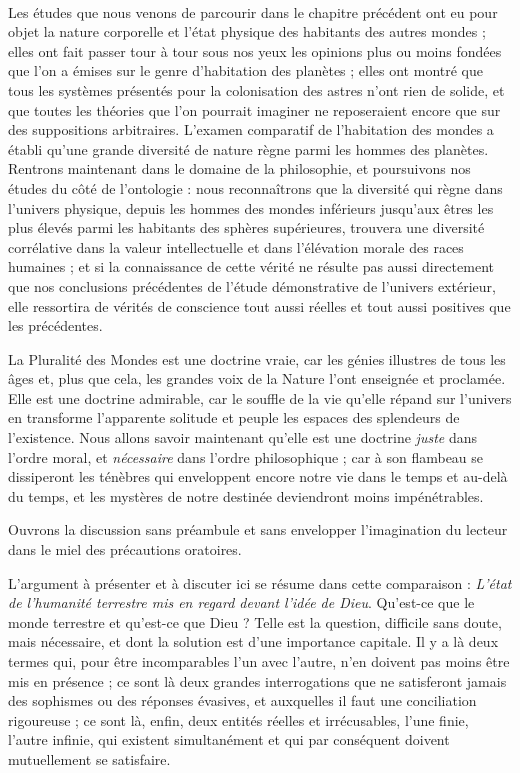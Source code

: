 \documentclass[a4paper, 11pt, oneside, landscape]{article}
\begin{document}
\paragraph{}
Les études que nous venons de parcourir dans le chapitre précédent ont eu pour objet la nature corporelle et l'état physique des habitants des autres mondes ; elles ont fait passer tour à tour sous nos yeux les opinions plus ou moins fondées que l'on a émises sur le genre d'habitation des planètes ; elles ont montré que tous les systèmes présentés pour la colonisation des astres n'ont rien de solide, et que toutes les théories que l'on pourrait imaginer ne reposeraient encore que sur des suppositions arbitraires. L'examen comparatif de l'habitation des mondes a établi qu'une grande diversité de nature règne parmi les hommes des planètes. Rentrons maintenant dans le domaine de la philosophie, et poursuivons nos études du côté de l'ontologie : nous reconnaîtrons que la diversité qui règne dans l'univers physique, depuis les hommes des mondes inférieurs jusqu'aux êtres les plus élevés parmi les habitants des sphères supérieures, trouvera une diversité corrélative dans la valeur intellectuelle et dans l'élévation morale des races humaines ; et si la connaissance de cette vérité ne résulte pas aussi directement que nos conclusions précédentes de l'étude démonstrative de l'univers extérieur, elle ressortira de vérités de conscience tout aussi réelles et tout aussi positives que les précédentes.

La Pluralité des Mondes est une doctrine vraie, car les génies illustres de tous les âges et, plus que cela, les grandes voix de la Nature l'ont enseignée et proclamée. Elle est une doctrine admirable, car le souffle de la vie qu'elle répand sur l'univers en transforme l'apparente solitude et peuple les espaces des splendeurs de l'existence. Nous allons savoir maintenant qu'elle est une doctrine \emph{juste} dans l'ordre moral, et \emph{nécessaire} dans l'ordre philosophique ; car à son flambeau se dissiperont les ténèbres qui enveloppent encore notre vie dans le temps et au-delà du temps, et les mystères de notre destinée deviendront moins impénétrables.

Ouvrons la discussion sans préambule et sans envelopper l'imagination du lecteur dans le miel des précautions oratoires.

L'argument à présenter et à discuter ici se résume dans cette comparaison : \emph{L'état de l'humanité terrestre mis en regard devant l'idée de Dieu}. Qu'est-ce que le monde terrestre et qu'est-ce que Dieu ? Telle est la question, difficile sans doute, mais nécessaire, et dont la solution est d'une importance capitale. Il y a là deux termes qui, pour être incomparables l'un avec l'autre, n'en doivent pas moins être mis en présence ; ce sont là deux grandes interrogations que ne satisferont jamais des sophismes ou des réponses évasives, et auxquelles il faut une conciliation rigoureuse ; ce sont là, enfin, deux entités réelles et irrécusables, l'une finie, l'autre infinie, qui existent simultanément et qui par conséquent doivent mutuellement se satisfaire.
\end{document}

